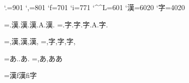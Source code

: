 \prebreakpenalty`.=901
\postbreakpenalty`,=801
\prebreakpenalty`f=701
\postbreakpenalty`i=771
\postbreakpenalty`\^^L=601
\postbreakpenalty`漢=6020
\prebreakpenalty`字=4020

=\hbox{.漢\relax.漢\null.漢.A{}.漢{}.\showlists}
=\hbox{.字\relax.字\null.字.A{}.字{}.\showlists}

=\hbox{,漢,\relax 漢\null,漢{},\showlists}
=\hbox{,字,\relax 字\null,字{},\showlists}

=\hbox{あ..\null あ{.}\showlists}
=\hbox{,あ\null ,{あ}\null {,}あ\showlists}

=\hbox{漢f漢fi字\showlists}


\bye